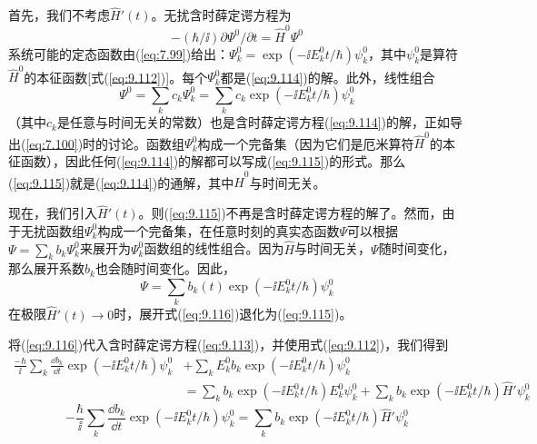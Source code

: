     首先，我们不考虑$\hat{H}'\left(t\right)$。无扰含时薛定谔方程为
    \begin{equation}
        -\left(\hbar/\ii \right)\partial \Psi^0/\partial t = \hat{H}^0 \Psi^0
        \label{eq:9.114}
    \end{equation}
    系统可能的定态函数由(\ref{eq:7.99})给出：$\Psi^0_k = \exp\left(-\ii E_k^0t/\hbar\right)\psi_k^0$，其中$\psi_k^0$是算符$\hat{H}^0$的本征函数[式(\ref{eq:9.112})]。每个$\Psi^0_k$都是(\ref{eq:9.114})的解。此外，线性组合
    \begin{equation}
        \Psi^0 = \sum_k c_k \Psi^0_k = \sum_k c_k \exp\left(-\ii E_k^0t/\hbar\right)\psi_k^0
        \label{eq:9.115}
    \end{equation}
    （其中$c_k$是任意与时间无关的常数）也是含时薛定谔方程(\ref{eq:9.114})的解，正如导出(\ref{eq:7.100})时的讨论。函数组$\Psi_k^0$构成一个完备集（因为它们是厄米算符$\hat{H}^0$的本征函数），因此任何(\ref{eq:9.114})的解都可以写成(\ref{eq:9.115})的形式。那么(\ref{eq:9.115})就是(\ref{eq:9.114})的通解，其中$\hat{H}^0$与时间无关。

    现在，我们引入$\hat{H}'\left(t\right)$。则(\ref{eq:9.115})不再是含时薛定谔方程的解了。然而，由于无扰函数组$\Psi_k^0$构成一个完备集，在任意时刻的真实态函数$\Psi$可以根据$\Psi = \sum_k b_k \Psi_k^0$来展开为$\Psi_k^0$函数组的线性组合。因为$\hat{H}$与时间无关，$\Psi$随时间变化，那么展开系数$b_k$也会随时间变化。因此，
    \begin{equation}
        \Psi = \sum_k b_k\left(t\right) \exp\left(-\ii E_k^0t/\hbar\right)\psi_k^0
        \label{eq:9.116}
    \end{equation}
    在极限$\hat{H}'\left(t\right) \to 0$时，展开式(\ref{eq:9.116})退化为(\ref{eq:9.115})。

    将(\ref{eq:9.116})代入含时薛定谔方程(\ref{eq:9.113})，并使用式(\ref{eq:9.112})，我们得到
    \begin{equation*}
        \begin{aligned}
            \frac{-\hbar}{\ii } \sum_k \frac{\dd b_k}{\dd t} \exp \left( -\ii E_k^0 t/\hbar \right) \psi_k^0 &+ \sum_k E_k^0 b_k \exp \left( -\ii E_k^0 t/\hbar \right) \psi_k^0 \\
            &= \sum_k b_k \exp \left( -\ii E_k^0 t/\hbar \right) E_k^0 \psi_k^0 + \sum_k b_k \exp \left( -\ii E_k^0 t/\hbar \right) \hat{H}'\psi_k^0
        \end{aligned}
    \end{equation*}
    \begin{equation*}
        - \frac{\hbar}{\ii }\sum_k \frac{\dd b_k}{\dd t} \exp \left( -\ii E_k^0 t/\hbar \right) \psi_k^0 = \sum_k b_k \exp \left( -\ii E_k^0 t/\hbar \right) \hat{H}'\psi_k^0
    \end{equation*}


